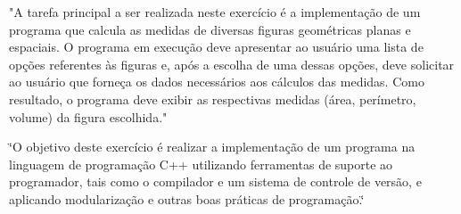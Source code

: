 "A tarefa principal a ser realizada neste exercício é a implementação de um programa que calcula as medidas de diversas figuras geométricas planas e espaciais. O programa em execução deve apresentar ao usuário uma lista de opções referentes às figuras e, após a escolha de uma dessas opções, deve solicitar ao usuário que forneça os dados necessários aos cálculos das medidas. Como resultado, o programa deve exibir as respectivas medidas (área, perímetro, volume) da figura escolhida."

\char`\"{}\+O objetivo deste exercício é realizar a implementação de um programa na linguagem de programação C++ utilizando ferramentas de suporte ao programador, tais como o compilador e um sistema de controle de versão, e aplicando modularização e outras boas práticas de programação.\char`\"{} 